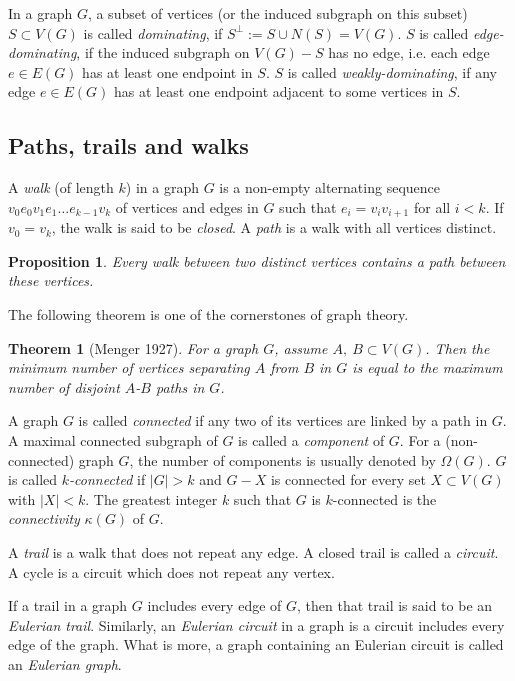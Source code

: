 \documentclass[12pt]{report}
\newtheorem{theorem}{Theorem}
\newtheorem{proposition}{Proposition}
\begin{document}
In a graph $G$, a subset of vertices (or the induced subgraph on this subset) $S\subset V(G)$ is called {\em dominating}, if $S^{\perp}:=S\cup N(S)=V(G)$. 
$S$ is called {\em edge-dominating}, if the induced subgraph on $V(G)-S$ has no edge, i.e. each edge $e\in E(G)$ has at least one endpoint in $S$.
$S$ is called {\em weakly-dominating}, if any edge $e\in E(G)$ has at least one endpoint adjacent to some vertices in $S$.


\subsection{Paths, trails and walks}

A {\em walk} (of length $k$) in a graph $G$ is a non-empty alternating sequence $v_0e_0v_1e_1\ldots e_{k-1}v_k$ of vertices and edges in $G$ such that $e_i=v_iv_{i+1}$ for all $i<k$. If $v_0=v_k$, the walk is said to be {\em closed}. A {\em path} is a walk with all vertices distinct. 
\begin{proposition}
Every walk between two distinct vertices contains a path between these vertices.
\end{proposition}

The following theorem is one of the cornerstones of graph theory.
\begin{theorem}[Menger 1927]\label{mengert27}
For a graph $G$, assume $A,~B\subset V(G)$. Then the minimum number of vertices separating $A$ from $B$ in $G$ is equal to the maximum number of disjoint $A$-$B$ paths in $G$.
\end{theorem}




A graph $G$ is called {\em connected} if any two of its vertices are linked by a path in $G$. A maximal connected subgraph of $G$ is called a {\em component} of $G$.  For a (non-connected) graph $G$, the number of components is usually denoted by $\Omega(G)$.
$G$ is called {\em $k$-connected} if $|G|>k$ and $G-X$ is connected for every set $X\subset V(G)$ with $|X|<k$. The greatest integer $k$ such that $G$ is $k$-connected is the {\em connectivity} $\kappa(G)$ of $G$.



A {\em trail} is a walk that does not repeat any edge.
A closed trail is called a {\em circuit}. A cycle is a circuit which does not repeat any vertex.


If a trail in a graph $G$ includes every edge of $G$, then that trail is said to be an {\em Eulerian trail}. Similarly, an {\em Eulerian circuit} in a graph is a circuit includes every edge of the graph. What is more, a graph containing an Eulerian circuit is called an {\em Eulerian graph}.
\end{document}
